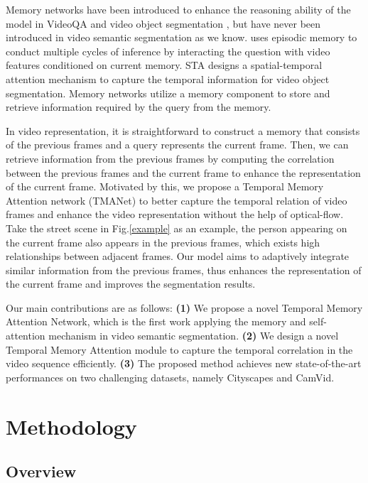 \documentclass{article}
\begin{document}
	Memory networks have been introduced to enhance the reasoning ability of the model in VideoQA \cite{motion2018, heterogeneous2019} and video object segmentation \cite{STA2019, faset_vos2020, enhanced2019}, but have never been introduced in video semantic segmentation as we know. 
	\cite{motion2018}  uses episodic memory to conduct multiple cycles of inference by interacting the question with video features conditioned on current memory. 
	STA \cite{STA2019} designs a spatial-temporal attention mechanism to capture the temporal information for video object segmentation. Memory networks utilize a memory component to store and retrieve information required by the query from the memory. 
	
	In video representation, it is straightforward to construct a memory that consists of the previous frames and a query represents the current frame. 
	Then, we can retrieve information from the previous frames by computing the correlation between the previous frames and the current frame to enhance the representation of the current frame.  
	Motivated by this, we propose a Temporal Memory Attention network (TMANet) to better capture the temporal relation of video frames and enhance the video representation without the help of optical-flow. 
	Take the street scene in Fig.\ref{example} as an example, the person appearing on the current frame also appears in the previous frames, which exists high relationships between adjacent frames. Our model aims to adaptively integrate similar information from the previous frames, thus enhances the representation of the current frame and improves the segmentation results.
	
	Our main contributions are as follows: 
	\textbf{(1)} We propose a novel Temporal Memory Attention Network, which is the first work applying the memory and self-attention mechanism in video semantic segmentation. 
	\textbf{(2)} We design a novel Temporal Memory Attention module to capture the temporal correlation in the video sequence efficiently. 
	\textbf{(3)} The proposed method achieves new state-of-the-art performances on two challenging datasets, namely Cityscapes and CamVid.
	
	\section{Methodology}
	\label{sec:approach}
	
	
	
	\subsection{Overview}
	
\end{document}
